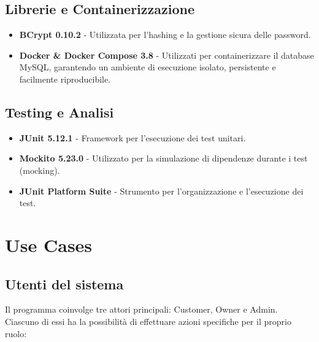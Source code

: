 \documentclass[a4paper,11pt]{article}
\begin{document}
\subsection{Librerie e Containerizzazione}
\begin{itemize}
    \item \textbf{BCrypt 0.10.2} - Utilizzata per l'hashing e la gestione sicura delle password.
    \item \textbf{Docker \& Docker Compose 3.8} - Utilizzati per containerizzare il database MySQL, garantendo un ambiente di esecuzione isolato, persistente e facilmente riproducibile.
\end{itemize}

\subsection{Testing e Analisi}
\begin{itemize}
    \item \textbf{JUnit 5.12.1} - Framework per l'esecuzione dei test unitari.
    \item \textbf{Mockito 5.23.0} - Utilizzato per la simulazione di dipendenze durante i test (mocking).
    \item \textbf{JUnit Platform Suite} - Strumento per l'organizzazione e l'esecuzione dei test.
\end{itemize}

\section{Use Cases}

\subsection{Utenti del sistema}

Il programma coinvolge tre attori principali: Customer, Owner e Admin. Ciascuno di essi ha la possibilità di effettuare azioni specifiche per il proprio ruolo:
\end{document}
